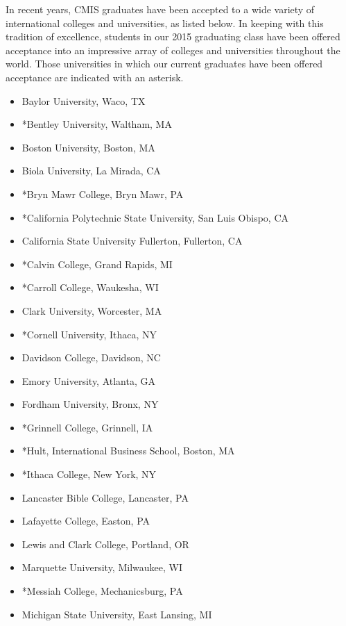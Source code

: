 \href{https://docs.google.com/document/d/1i8tDt8omsO9Zz4Zj40uOpUz8twkbGHYSk_PDs3Rqup4/edit}{}

In recent years, CMIS graduates have been accepted to a wide variety of international colleges and universities, as listed below. In keeping with this tradition of excellence, students in our 2015 graduating class have been offered acceptance into an impressive array of colleges and universities throughout the world. Those universities in which our current graduates have been offered acceptance are indicated with an asterisk. 

\begin{itemize}
\item Baylor University, Waco, TX
\item *Bentley University, Waltham, MA
\item Boston University, Boston, MA
\item Biola University, La Mirada, CA
\item *Bryn Mawr College, Bryn Mawr, PA
\item *California Polytechnic State University, San Luis Obispo, CA
\item California State University Fullerton, Fullerton, CA
\item *Calvin College, Grand Rapids, MI
\item *Carroll College, Waukesha, WI
\item Clark University, Worcester, MA
\item *Cornell University, Ithaca, NY
\item Davidson College, Davidson, NC
\item Emory University, Atlanta, GA
\item Fordham University, Bronx, NY
\item *Grinnell College, Grinnell, IA
\item *Hult, International Business School, Boston, MA
\item *Ithaca College, New York, NY
\item Lancaster Bible College, Lancaster, PA
\item Lafayette College, Easton, PA
\item Lewis and Clark College, Portland, OR
\item Marquette University, Milwaukee, WI
\item *Messiah College, Mechanicsburg, PA
\item Michigan State University, East Lansing, MI

\end{itemize}
